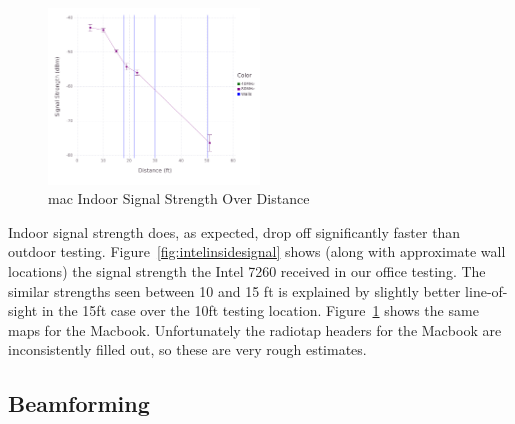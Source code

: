 \begin{figure}[!h]
\centering
\includegraphics[width=0.5\textwidth]{figures/Mac_Inside_Beamformed}
\caption{mac Indoor Signal Strength Over Distance}
\label{fig:macinsidesignal}
\end{figure}

Indoor signal strength does, as expected, drop off significantly
faster than outdoor testing. Figure~\ref{fig:intelinsidesignal} shows
(along with approximate wall locations) the signal strength the Intel
7260 received in our office testing. The similar strengths seen between
10 and 15 ft is explained by slightly better line-of-sight in the 15ft
case over the 10ft testing location. Figure~\ref{fig:macinsidesignal}
shows the same maps for the Macbook. Unfortunately the radiotap
headers for the Macbook are inconsistently filled out, so these are
very rough estimates.




\subsection{Beamforming}


